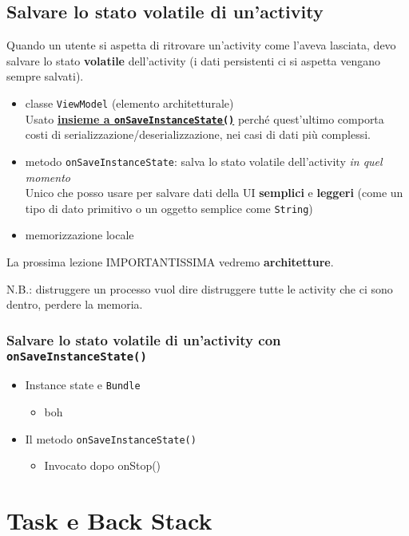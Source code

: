 \section{Salvare lo stato volatile di un'activity}
\par Quando un utente si aspetta di ritrovare un'activity come l'aveva lasciata, devo salvare lo stato \textbf{volatile} dell'activity (i dati persistenti ci si aspetta vengano sempre salvati). 
\begin{itemize}
    \item classe \texttt{ViewModel} (elemento architetturale)\\
    Usato \textbf{\underline{insieme a \texttt{onSaveInstanceState()}}} perché quest'ultimo comporta costi di serializzazione/deserializzazione, nei casi di dati più complessi.
    \item metodo \texttt{onSaveInstanceState}: salva lo stato volatile dell'activity \textit{in quel momento}\\
    Unico che posso usare per salvare dati della UI \textbf{semplici} e \textbf{leggeri} (come un tipo di dato primitivo o un oggetto semplice come \texttt{String})
    \item memorizzazione locale
\end{itemize}
La prossima lezione IMPORTANTISSIMA vedremo \textbf{architetture}.
\par N.B.: distruggere un processo vuol dire distruggere tutte le activity che ci sono dentro, perdere la memoria.

\subsection{Salvare lo stato volatile di un'activity con \texttt{onSaveInstanceState()}}
\begin{itemize}
    \item Instance state e \texttt{Bundle}
    \begin{itemize}
        \item boh
    \end{itemize}
    \item Il metodo \texttt{onSaveInstanceState()}
    \begin{itemize}
        \item Invocato dopo onStop()
    \end{itemize}
\end{itemize}

\chapter{Task e Back Stack}
